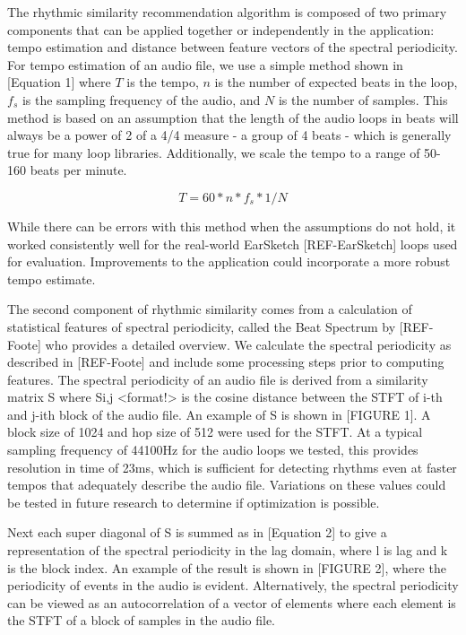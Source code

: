 \documentclass{article}
\begin{document}
The rhythmic similarity recommendation algorithm is composed of two primary components that can be applied together or independently in the application: tempo estimation and distance between feature vectors of the spectral periodicity. For tempo estimation of an audio file, we use a simple method shown in [Equation 1] where \(T\) is the tempo, \(n\) is the number of expected beats in the loop, \(f_s\) is the sampling frequency of the audio, and \(N\) is the number of samples. This method is based on an assumption that the length of the audio loops in beats will always be a power of 2 of a 4/4 measure - a group of 4 beats - which is generally true for many loop libraries. Additionally, we scale the tempo to a range of 50-160 beats per minute.

\begin{equation}
T = 60 * n * f_s * 1/N
\end{equation}

While there can be errors with this method when the assumptions do not hold, it worked consistently well for the real-world EarSketch [REF-EarSketch] loops used for evaluation. Improvements to the application could incorporate a more robust tempo estimate.

The second component of rhythmic similarity comes from a calculation of statistical features of spectral periodicity, called the Beat Spectrum by [REF-Foote] who provides a detailed overview. We calculate the spectral periodicity as described in [REF-Foote] and include some processing steps prior to computing features. The spectral periodicity of an audio file is derived from a similarity matrix S where Si,j <format!> is the cosine distance between the STFT of i-th and j-ith block of the audio file. An example of S is shown in [FIGURE 1]. A block size of 1024 and hop size of 512 were used for the STFT. At a typical sampling frequency of 44100Hz for the audio loops we tested, this provides resolution in time of 23ms, which is sufficient for detecting rhythms even at faster tempos that adequately describe the audio file. Variations on these values could be tested in future research to determine if optimization is possible.

Next each super diagonal of S is summed as in [Equation 2] to give a representation of the spectral periodicity in the lag domain, where l is lag and k is the block index. An example of the result is shown in [FIGURE 2], where the periodicity of events in the audio is evident. Alternatively, the spectral periodicity can be viewed as an autocorrelation of a vector of elements where each element is the STFT of a block of samples in the audio file.
\end{document}
